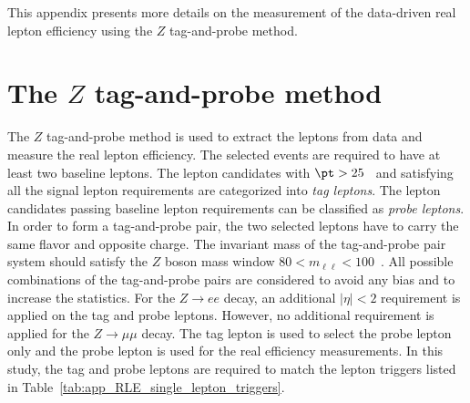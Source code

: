 This appendix presents more details on the measurement of the data-driven real lepton efficiency using the $Z$ tag-and-probe method.


\section{The $Z$ tag-and-probe method}
\label{sec:app_RLE_ZTandP_method}
The $Z$ tag-and-probe method is used to extract the leptons from data and measure the real lepton efficiency.
The selected events are required to have at least two baseline leptons.
The lepton candidates with $\pt > 25$~{\GeV} and satisfying all the signal lepton requirements are categorized into \textit{tag leptons}.
The lepton candidates passing baseline lepton requirements can be classified as \textit{probe leptons}.
In order to form a tag-and-probe pair, the two selected leptons have to carry the same flavor and opposite charge.
The invariant mass of the tag-and-probe pair system should satisfy the $Z$ boson mass window $80 < m_{\ell \ell} < 100$~{\GeV}.
All possible combinations of the tag-and-probe pairs are considered to avoid any bias and to increase the statistics.
For the $Z \to ee$ decay, an additional $|\eta| < 2$ requirement is applied on the tag and probe leptons.
However, no additional requirement is applied for the $Z \to \mu \mu$ decay.
The tag lepton is used to select the probe lepton only and the probe lepton is used for the real efficiency measurements.
In this study, the tag and probe leptons are required to match the lepton triggers listed in Table~\ref{tab:app_RLE_single_lepton_triggers}.

